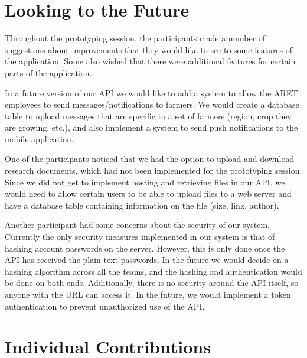 \documentclass[12pt,letterpaper]{article}
\begin{document}
\section{Looking to the Future}
Throughout the prototyping session, the participants made a number of suggestions about improvements that they would like to see to some features of the application. Some also wished that there were additional features for certain parts of the application.\par	
In a future version of our API we would like to add a system to allow the ARET employees to send messages/notifications to farmers. We would create a database table to upload messages that are specific to a set of farmers (region, crop they are growing, etc.), and also implement a system to send push notifications to the mobile application.\par
One of the participants noticed that we had the option to upload and download research documents, which had not been implemented for the prototyping session. Since we did not get to implement hosting and retrieving files in our API, we would need to allow certain users to be able to upload files to a web server and have a database table containing information on the file (size, link, author).\par
Another participant had some concerns about the security of our system. Currently the only security measures implemented in our system is that of hashing account passwords on the server. However, this is only done once the API has received the plain text passwords. In the future we would decide on a hashing algorithm across all the teams, and the hashing and authentication would be done on both ends. Additionally, there is no security around the API itself, so anyone with the URL can access it. In the future, we would implement a token authentication to prevent unauthorized use of the API.\par

\clearpage
\section{Individual Contributions}
\end{document}
